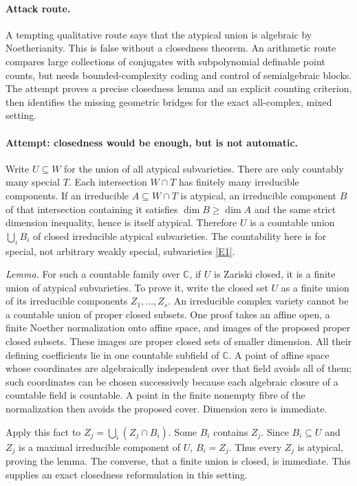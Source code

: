 \documentclass[11pt,a4paper]{article}
\numberwithin{equation}{section}
\newcommand{\C}{\mathbb{C}}
\newcommand{\eref}[2]{\hyperlink{extra:#1:#2}{[E#2]}}
\begin{document}
\paragraph{Attack route.}
A tempting qualitative route says that the atypical union is algebraic by
Noetherianity. This is false without a closedness theorem. An arithmetic
route compares large collections of conjugates with subpolynomial definable
point counts, but needs bounded-complexity coding and control of
semialgebraic blocks. The attempt proves a precise closedness lemma and
an explicit counting criterion, then identifies the missing geometric
bridges for the exact all-complex, mixed setting.

\paragraph{Attempt: closedness would be enough, but is not automatic.}
Write $U\subseteq W$ for the union of all atypical subvarieties.
There are only countably many special $T$. Each intersection $W\cap T$
has finitely many irreducible components. If an irreducible
$A\subseteq W\cap T$ is atypical, an irreducible component $B$ of that
intersection containing it satisfies $\dim B\geq\dim A$ and the same
strict dimension inequality, hence is itself atypical. Therefore $U$ is
a countable union $\bigcup_i B_i$ of closed irreducible atypical subvarieties.
The countability here is for special, not arbitrary weakly special,
subvarieties \eref{30006716}{1}.

\emph{Lemma.} For such a countable family over $\C$, if $U$ is Zariski
closed, it is a finite union of atypical subvarieties.
To prove it, write the closed set $U$ as a finite union of its irreducible
components $Z_1,\ldots,Z_s$. An irreducible complex variety cannot be a
countable union of proper closed subsets. One proof takes an affine open,
a finite Noether normalization onto affine space, and images of the proposed
proper closed subsets. These images are proper closed sets of smaller
dimension. All their defining coefficients lie in one countable subfield
of $\C$. A point of affine space whose coordinates are algebraically
independent over that field avoids all of them; such coordinates can be
chosen successively because each algebraic closure of a countable field
is countable. A point in the finite nonempty fibre of the normalization
then avoids the proposed cover. Dimension zero is immediate.

Apply this fact to
$Z_j=\bigcup_i(Z_j\cap B_i)$. Some $B_i$ contains $Z_j$. Since
$B_i\subseteq U$ and $Z_j$ is a maximal irreducible component of $U$,
$B_i=Z_j$. Thus every $Z_j$ is atypical, proving the lemma. The converse,
that a finite union is closed, is immediate. This supplies an exact
closedness reformulation in this setting.
\end{document}
